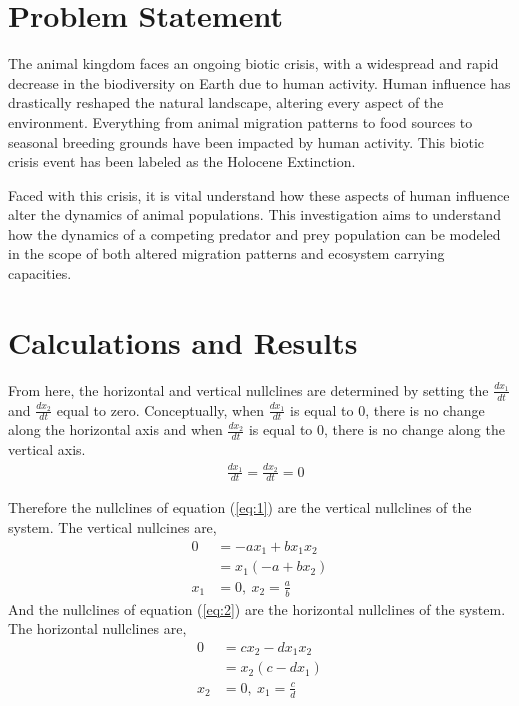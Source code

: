 \documentclass[12pt]{article}   %
\theoremstyle{definition}
\numberwithin{equation}{section}
\begin{document}
\setcounter{page}{2}
\section{Problem Statement} \label{APPM2360proj01sec01}
\quad The animal kingdom faces an ongoing biotic crisis, with a widespread and rapid decrease in the biodiversity on Earth due to human activity. Human influence has drastically reshaped the natural landscape, altering every aspect of the environment. Everything from animal migration patterns to food sources to seasonal breeding grounds have been impacted by human activity. This biotic crisis event has been labeled as the Holocene Extinction.

\quad Faced with this crisis, it is vital understand how these aspects of human influence alter the dynamics of animal populations. This investigation aims to understand how the dynamics of a competing predator and prey population can be modeled in the scope of both altered migration patterns and ecosystem carrying capacities.      

 



\setcounter{page}{2}
\section{Calculations and Results} \label{APPM2360proj01sec01} 

From here, the horizontal and vertical nullclines are determined by setting the $\frac{dx_1}{dt}$ and $\frac{dx_2}{dt}$ equal to zero. Conceptually, when $\frac{dx_1}{dt}$ is equal to 0, there is no change along the horizontal axis and when $\frac{dx_2}{dt}$ is equal to 0, there is no change along the vertical axis. 
\begin{align*}
  & \frac{dx_1}{dt} = \frac{dx_2}{dt} = 0
\end{align*}

Therefore the nullclines of equation (\ref{eq:1}) are the vertical nullclines of the system. The vertical nullcines are,
\begin{align*}
  0 & =  -ax_1 + bx_1x_2 \\
  & = x_1(-a + bx_2) \\
  x_1 &= 0, \ x_2 = \frac{a}{b}  
\end{align*}
And the nullclines of equation (\ref{eq:2}) are the horizontal nullclines of the system. The horizontal nullclines are, 
\begin{align*}
  0 & = cx_2 - dx_1x_2 \\  
  & =  x_2(c - dx_1) \\
  x_2 &= 0, \ x_1 = \frac{c}{d} 
\end{align*}
\end{document}
